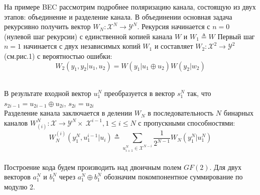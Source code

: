 \documentclass[a1paper,portrait,fontscale=0.554]{baposter}
\begin{document}
\begin{poster}
{На примере BEC рассмотрим подробнее поляризацию канала, состоящую из двух этапов: объединение  и разделение канала.
В объединении основная задача рекурсивно получить вектор $W_N:\mathcal{X}^N \rightarrow \mathcal{Y}^N$. Рекурсия начинается с $n = 0$ (нулевой шаг рекурсии) с единственной копией канала $W$ и $W_1 \triangleq W$ Первый шаг $n = 1$ начинается с двух независимых копий $W_1$ и составляет $W_2: \mathcal{X}^2 \rightarrow \mathcal{Y}^2$ (см.рис.1) с вероятностью ошибки:
\begin{equation}
    W_2(y_1,y_2|u_1,u_2) = W(y_1|u_1 \oplus u_2)W(y_2|w_2)
\end{equation}
\newcommand{\suma}{\Large$+$}
\newcommand{\inte}{$\displaystyle \int$}


\caption{}
\\

В результате входной вектор $u_1^N$ преобразуется в вектор $s_1^N$ так, что $s_{2i-1} = u_{2i-1} \oplus u_{2i}$, $s_{2i}=u_{2i} $
\\
Разделение канала заключается в делении $W_N$ в последовательность $N$ бинарных каналов $W_(i)^N : \mathcal{X} \rightarrow \mathcal{Y}^N \times \ \mathcal{X}^{i-1}, 1\leq i \leq N$ с пропускными способностями:
\begin{equation}
    W_N^{(i)}(y_1^N,u_1^{i-1}|u_i) \triangleq \sum\limits_{u^N_{i+1} \in\mathcal{X}^{N-i}} \frac{1}{2^{N-1}}W_N(y_1^N|u_1^N)
\end{equation}
\\ 
Построение кода будем производить над двоичным полем $GF(2)$. Для двух векторов $a_1^N$ и $b_1^N$ через $a_1^N \oplus b_1^N$ обозначим покомпонентное суммирование по модулю 2. 

}
\end{poster}
\end{document}
